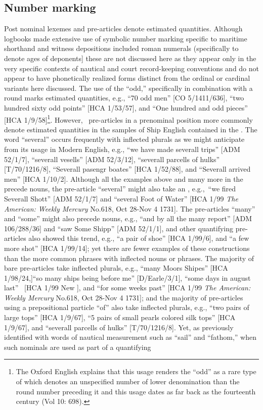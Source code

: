 \subsection{{Number marking}}\label{sec:5.3.2}

Post nominal lexemes and  pre-articles denote estimated quantities. Although logbooks made extensive use of symbolic number marking specific to maritime shorthand and witness depositions included roman numerals (specifically to denote ages of deponents] these are not discussed here as they appear only in the very specific contexts of nautical and court record-keeping conventions and do not appear to have phonetically realized forms distinct from the ordinal or cardinal variants here discussed.  The use of the  “odd,” specifically in combination with a round  marks estimated quantities, e.g., “70 odd men” [CO 5/1411/636], “two hundred sixty odd points” [HCA 1/53/57], and “One hundred and odd pieces” [HCA 1/9/58]\footnote{The Oxford English \citet{Dictionary1989} explains that this usage renders the  “odd” as a rare type of   which denotes an unspecified number of lower denomination than the round number preceding it and this usage dates as far back as the fourteenth century (Vol 10: 698).}.  However,~ pre-articles in a prenominal position more commonly denote estimated quantities in the samples of Ship English contained in the . The word “several” occurs frequently with inflected plurals as we might anticipate from its usage in Modern English, e.g., “we have made severall trips” [ADM 52/1/7], “severall vesells” [ADM 52/3/12], “severall parcells of hulks” [T/70/1216/8], “Severall pasengr boates” [HCA 1/52/88], and “Severall arrived men” [HCA 1/10/2]. Although all the examples above and many more in the  precede  nouns, the pre-article “several” might also take an  , e.g.,~“we fired Severall Shott” [ADM 52/1/7] and “several Foot of Water” [HCA 1/99 \textit{The American: Weekly Mercury} No.618, Oct 28-Nov 4 1731]. The pre-articles “many” and “some” might also precede  nouns, e.g., “and by all the many report” [ADM 106/288/36] and “saw Some Shipp” [ADM 52/1/1], and other quantifying pre-articles also showed this trend, e.g., “a pair of shoe” [HCA 1/99/6], and “a few more shot” [HCA 1/99/14]; yet there are fewer examples of these constructions than the more common phrases with inflected nouns or  phrases. The majority of bare pre-articles take inflected plurals, e.g., “many Moors Shipes” [HCA 1/98/24,]“so many ships being before me” [D/Earle/3/1], “some days in august last” ~[HCA 1/99 New \citealt{Providence1722}], and “for some weeks past” [HCA 1/99 \textit{The American: Weekly Mercury} No.618, Oct 28-Nov 4 1731]; and the majority of pre-articles using a prepositional particle “of” also take inflected plurals, e.g., “two pairs of large tops” [HCA 1/9/67], “5 pairs of small pearls colored silk tops” [HCA 1/9/67], and “severall parcells of hulks” [T/70/1216/8]. Yet, as previously identified with words of nautical measurement such as “sail” and “fathom,” when such nominals are used as part of a quantifying 